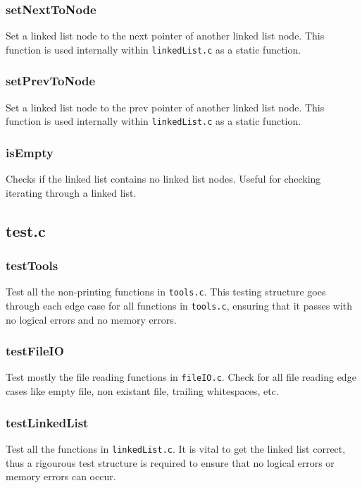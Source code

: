 \documentclass[a4paper, 12pt, titlepage]{article}
\newcommand{\code}[1]{\small\texttt{#1}\normalsize}
\begin{document}
\subsubsection{setNextToNode}

Set a linked list node to the next pointer of another linked list node. This 
function is used internally within \code{linkedList.c} as a static function.

\subsubsection{setPrevToNode}

Set a linked list node to the prev pointer of another linked list node. This 
function is used internally within \code{linkedList.c} as a static function.

\subsubsection{isEmpty}

Checks if the linked list contains no linked list nodes. Useful for checking 
iterating through a linked list.

\pagebreak
\subsection{test.c}
\subsubsection{testTools}

Test all the non-printing functions in \code{tools.c}. This testing structure 
goes through each edge case for all functions in \code{tools.c}, ensuring 
that it passes with no logical errors and no memory errors.

\subsubsection{testFileIO}

Test mostly the file reading functions in \code{fileIO.c}. Check for all 
file reading edge cases like empty file, non existant file, trailing 
whitespaces, etc.

\subsubsection{testLinkedList}

Test all the functions in \code{linkedList.c}. It is vital to get the linked 
list correct, thus a rigourous test structure is required to ensure that no 
logical errors or memory errors can occur.
\end{document}
